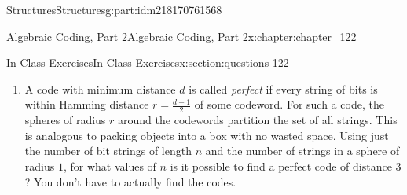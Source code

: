 \documentclass[oneside,10pt,]{book}
\numberwithin{equation}{section}
\providecommand\phantomsection{}
\begin{document}
\begin{partptx}{Structures}{}{Structures}{}{}{g:part:idm218170761568}
\begin{chapterptx}{Algebraic Coding, Part 2}{}{Algebraic Coding, Part 2}{}{}{x:chapter:chapter_122}
\begin{sectionptx}{In-Class Exercises}{}{In-Class Exercises}{}{}{x:section:questions-122}
\begin{enumerate}[label=\arabic*.]
\begin{equation*}
\begin{array}{cc|c}
1 & 1 & 0\\
0 & 1 & 1\\
\hline
1 & 0 &\\
\end{array}
\end{equation*}
and the code word is the string 11001110.%
\par
%
\begin{enumerate}[label=(\alph*)]
\item{}Suppose that you were sent four bit messages using this code and you received the following strings.  What were the messages, assuming no more than one error in the transmission of coded data?%
\begin{multicols}{3}
\begin{enumerate}[label=(\roman*)]
\item{}11011000%
\item{}01110010%
\item{}10001111%
\end{enumerate}
\end{multicols}
%
\item{}If you encoded \(n^2\) bits in this manner, what would be the rate of the code?%
\item{}Rectangular codes are linear codes.  For the 3 by 2 rectangular code, what are the generator and parity check matrices?%
\end{enumerate}
%
\item{}A code with minimum distance \(d\) is called \emph{perfect} if every string of bits is within Hamming distance \(r=\frac{d-1}{2}\) of some codeword. For such a code, the spheres of radius \(r\) around the codewords partition the set of all strings.  This is analogous to packing objects into a box with no wasted space.  Using just the number of bit strings of length \(n\) and the number of strings in a sphere of radius \(1\), for what values of \(n\) is it possible to find a perfect code of distance \(3\)?  You don't have to actually find the codes.%
\end{enumerate}
%
\end{sectionptx}
\end{chapterptx}
\end{partptx}
%
\backmatter%
%
\clearpage\phantomsection%
%
%
%
\typeout{************************************************}
\typeout{************************************************}
%
\end{document}
